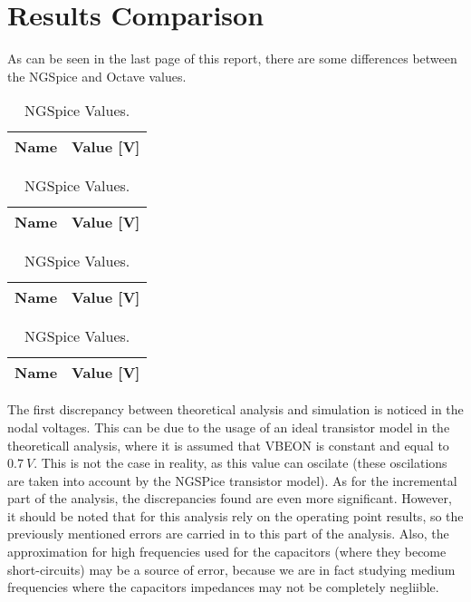 \section{Results Comparison}
\label{sec:comparison}


As can be seen in the last page of this report, there are some differences between the NGSpice and Octave values.


\begin{table}[h]
        \parbox{.45\linewidth}{
  \centering
  \begin{tabular}{|l|r|}
    \hline
    {\bf Name} & {\bf Value [V]} \\ \hline
	    
	    
  \end{tabular}
  \caption{Octave Values.}                              
        \label{tab:comp1a}      
}
\hfill
        \parbox{.45\linewidth}{
  \centering
  \begin{tabular}{|l|r|}
    \hline
    {\bf Name} & {\bf Value [V]} \\ \hline
	   
  \end{tabular}
  \caption{NGSpice Values.}                              
  \label{tab:comp1b} 
}
\end{table}

\begin{table}[h]
        \parbox{.45\linewidth}{
  \centering
  \begin{tabular}{|l|r|}
    \hline
    {\bf Name} & {\bf Value [V]} \\ \hline
     
  \end{tabular}
  \caption{Octave Values.}
        \label{tab:comp2a}
}
\hfill
        \parbox{.45\linewidth}{
  \centering
  \begin{tabular}{|l|r|}
    \hline
    {\bf Name} & {\bf Value [V]} \\ \hline
	
  \end{tabular}
  \caption{NGSpice Values.}
  \label{tab:comp2b}
}
\end{table}



The first discrepancy between theoretical analysis and simulation is noticed in the nodal voltages. This can be due to the usage of an ideal transistor model in the theoreticall analysis, where it is assumed that VBEON is constant and equal to $0.7~V$. This is not the case in reality, as this value can oscilate (these oscilations are taken into account by the NGSPice transistor model).
As for the incremental part of the analysis, the discrepancies found are even more significant. However, it should be noted that for this analysis rely on the operating point results, so the previously mentioned errors are carried in to this part of the analysis. Also, the approximation for high frequencies used for the capacitors (where they become short-circuits) may be a source of error, because we are in fact studying medium frequencies where the capacitors impedances may not be completely negliible.
